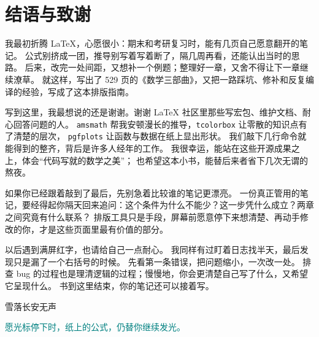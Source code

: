 \chapter*{结语与致谢}
{}

我最初折腾 \LaTeX{}，心愿很小：期末和考研复习时，能有几页自己愿意翻开的笔记。
公式别挤成一团，推导别写着写着断了，隔几周再看，还能认出当时的思路。
后来，改完一处间距，又想补一个例题；整理好一章，又舍不得让下一章继续潦草。
就这样，写出了 529 页的《数学三部曲》，又把一路踩坑、修补和反复编译的经验，写成了这本排版指南。

写到这里，我最想说的还是谢谢。谢谢 \LaTeX{} 社区里那些写宏包、维护文档、耐心回答问题的人。
\texttt{amsmath} 帮我安顿漫长的推导，\texttt{tcolorbox} 让零散的知识点有了清楚的层次，
\texttt{pgfplots} 让函数与数据在纸上显出形状。
我们敲下几行命令就能得到的整齐，背后是许多人经年的工作。
我很幸运，能站在这些开源成果之上，体会“代码写就的数学之美”；
也希望这本小书，能替后来者省下几次无谓的熬夜。

如果你已经跟着敲到了最后，先别急着比较谁的笔记更漂亮。
一份真正管用的笔记，要经得起你隔天回来追问：这个条件为什么不能少？这一步凭什么成立？两章之间究竟有什么联系？
排版工具只是手段，屏幕前愿意停下来想清楚、再动手修改的你，才是这些页面里最有价值的部分。

以后遇到满屏红字，也请给自己一点耐心。
我同样有过盯着日志找半天，最后发现只是漏了一个右括号的时候。
先看第一条错误，把问题缩小，一次改一处。
排查 bug 的过程也是理清逻辑的过程；慢慢地，你会更清楚自己写了什么，又希望它呈现什么。
书到这里结束，你的笔记还可以接着写。

\begin{flushright}
雪落长安无声
\end{flushright}
\medskip
\noindent\textcolor{Teal}{愿光标停下时，纸上的公式，仍替你继续发光。}
